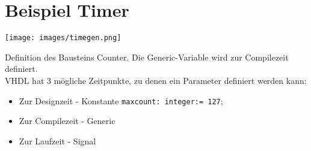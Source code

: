 \section{Beispiel Timer}
\begin{minipage}[]{0.49\textwidth}
\texttt{[image: images/timegen.png]}

Definition des Bausteins Counter. Die Generic-Variable wird zur Compilezeit definiert.\\
VHDL hat 3 mögliche Zeitpunkte, zu denen ein Parameter definiert werden kann:
\begin{itemize}
\itemsep0em
\item Zur Designzeit - Konstante \texttt{maxcount: integer:= 127};
\item Zur Compilezeit - Generic
\item Zur Laufzeit - Signal
\end{itemize} 


\end{minipage}
\hfill
\begin{minipage}[]{0.49\textwidth}

\end{minipage}